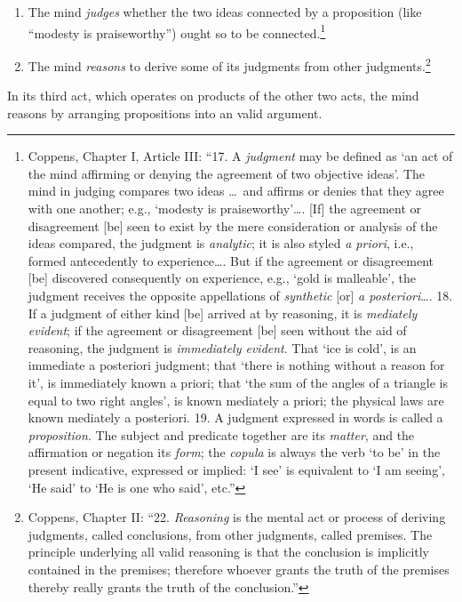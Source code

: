 \begin{enumerate}
{      }
   \item The mind \emph{judges} whether the two ideas connected by a
      proposition (like ``modesty is praiseworthy'') ought so to be
      connected.\footnote{%
         Coppens, Chapter I, Article III\@: ``17. A \emph{judgment} may be
         defined as `an act of the mind affirming or denying the agreement of
         two objective ideas'.  The mind in judging compares two ideas \ldots\
         and affirms or denies that they agree with one another; e.g., `modesty
         is praiseworthy'\ldots.  [If] the agreement or disagreement [be] seen
         to exist by the mere consideration or analysis of the ideas compared,
         the judgment is \emph{analytic}; it is also styled \emph{a priori},
         i.e., formed antecedently to experience\ldots. But if the agreement or
         disagreement [be] discovered consequently on experience, e.g., `gold
         is malleable', the judgment receives the opposite appellations of
         \emph{synthetic} [or] \emph{a posteriori}\ldots.  18.  If a judgment
         of either kind [be] arrived at by reasoning, it is \emph{mediately
         evident}; if the agreement or disagreement [be] seen without the aid
         of reasoning, the judgment is \emph{immediately evident}. That `ice is
         cold', is an immediate a posteriori judgment; that `there is nothing
         without a reason for it', is immediately known a priori; that `the sum
         of the angles of a triangle is equal to two right angles', is known
         mediately a priori; the physical laws are known mediately a
         posteriori.  19. A judgment expressed in words is called a
         \emph{proposition}.  The subject and predicate together are its
         \emph{matter}, and the affirmation or negation its \emph{form}; the
         \emph{copula} is always the verb `to be' in the present indicative,
         expressed or implied: `I see' is equivalent to `I am seeing', `He
         said' to `He is one who said', etc.''%
      }
   \item The mind \emph{reasons} to derive some of its judgments from other
      judgments.\footnote{%
         Coppens, Chapter II\@: ``22. \emph{Reasoning} is the mental act or
         process of deriving judgments, called conclusions, from other
         judgments, called premises.  The principle underlying all valid
         reasoning is that the conclusion is implicitly contained in the
         premises; therefore whoever grants the truth of the premises thereby
         really grants the truth of the conclusion.''%
      }
\end{enumerate}
In its third act, which operates on products of the other two acts, the mind
reasons by arranging propositions into an valid argument.

